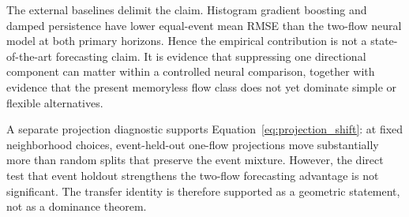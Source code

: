 The external baselines delimit the claim. Histogram gradient boosting and damped persistence have lower equal-event mean RMSE than the two-flow neural model at both primary horizons. Hence the empirical contribution is not a state-of-the-art forecasting claim. It is evidence that suppressing one directional component can matter within a controlled neural comparison, together with evidence that the present memoryless flow class does not yet dominate simple or flexible alternatives.

A separate projection diagnostic supports Equation~\eqref{eq:projection_shift}: at fixed neighborhood choices, event-held-out one-flow projections move substantially more than random splits that preserve the event mixture. However, the direct test that event holdout strengthens the two-flow forecasting advantage is not significant. The transfer identity is therefore supported as a geometric statement, not as a dominance theorem.
